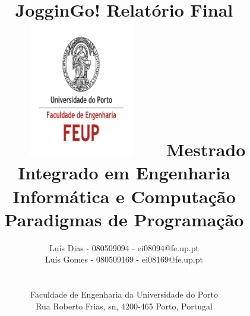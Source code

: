 \documentclass[15pt,a4paper]{article}
\begin{document}
\setlength{\textwidth}{16cm}
\setlength{\textheight}{22cm}

\title{\Large\textbf{JogginGo!}\linebreak\linebreak\linebreak
\Large\textbf{Relatório Final}\linebreak\linebreak
\includegraphics[height=6cm, width=7cm]{feup.pdf}\linebreak \linebreak
\Large{Mestrado Integrado em Engenharia Informática e Computação} \linebreak \linebreak
\Large{Paradigmas de Programação}\linebreak
}

\author{ Luís Dias - 080509094 - ei08094@fe.up.pt \\ Luís Gomes - 080509169 - ei08169@fe.up.pt \\\linebreak\linebreak \\
\\ Faculdade de Engenharia da Universidade do Porto \\ Rua Roberto Frias, s\/n, 4200-465 Porto, Portugal \linebreak\linebreak\linebreak
\linebreak\linebreak\vspace{1cm}}
\maketitle
\thispagestyle{empty}

\end{document}
